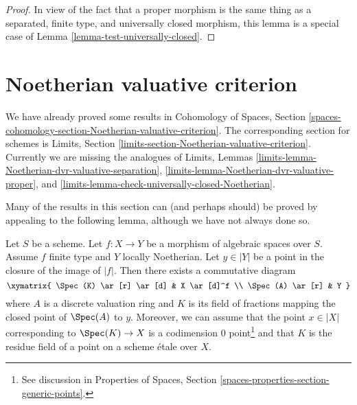 \begin{proof}
In view of the fact that a proper morphism is the same thing as
a separated, finite type, and universally closed morphism, this
lemma is a special case of Lemma \ref{lemma-test-universally-closed}.
\end{proof}


\section{Noetherian valuative criterion}
\label{section-Noetherian-valuative-criterion}

\noindent
We have already proved some results in Cohomology of Spaces, Section
\ref{spaces-cohomology-section-Noetherian-valuative-criterion}.
The corresponding section for schemes is
Limits, Section \ref{limits-section-Noetherian-valuative-criterion}.
Currently we are missing the analogues of
Limits, Lemmas
\ref{limits-lemma-Noetherian-dvr-valuative-separation},
\ref{limits-lemma-Noetherian-dvr-valuative-proper}, and
\ref{limits-lemma-check-universally-closed-Noetherian}.

\medskip\noindent
Many of the results in this section can (and perhaps should)
be proved by appealing to the following lemma, although we have not
always done so.

\begin{lemma}
\label{lemma-reach-point-closure-Noetherian}
Let $S$ be a scheme. Let $f : X \to Y$ be a morphism of algebraic spaces
over $S$. Assume $f$ finite type and $Y$ locally Noetherian.
Let $y \in |Y|$ be a point in the closure of the image of $|f|$.
Then there exists a commutative diagram
$$
\xymatrix{
\Spec(K) \ar[r] \ar[d] & X \ar[d]^f \\
\Spec(A) \ar[r] & Y
}
$$
where $A$ is a discrete valuation ring and $K$ is its field of fractions
mapping the closed point of $\Spec(A)$ to $y$. Moreover, we can assume
that the point $x \in |X|$ corresponding to $\Spec(K) \to X$ is a
codimension $0$ point\footnote{See discussion in
Properties of Spaces, Section \ref{spaces-properties-section-generic-points}.}
and that $K$ is the residue field of a point
on a scheme \'etale over $X$.
\end{lemma}

